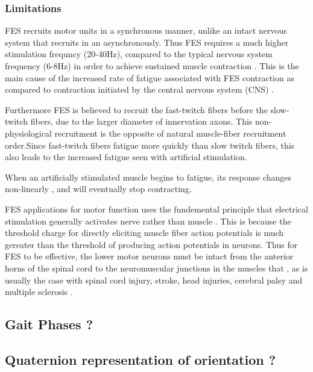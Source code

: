 \subsubsection{Limitations}
FES recruits motor units in a synchronous manner, unlike an intact nervous system that recruits in an asynchronously. Thus FES requires a much higher stimulation frequncy (20-40Hz), compared to the typical nervous system frequency (6-8Hz) in order to achieve sustained muscle contraction \cite{lynch_functional_2008}. This is the main cause of the increased rate of fatigue associated with FES contraction as compared to contraction initiated by the central nervous system (CNS) \cite{gilman_handbook_1983}. 

Furthermore FES is believed to recruit the fast-twitch fibers before the slow-twitch fibers, due to the larger diameter of innervation axons. This non-physiological recruitment is the opposite of natural muscle-fiber recruitment order.Since fast-twitch fibers fatigue more quickly than slow twitch fibers, this also leads to the increased fatigue seen with artificial stimulation. \cite{lynch_functional_2008}

When an artificially stimulated muscle begins to fatigue, its response changes non-linearly \cite{lynch_functional_2008}, and will eventually stop contracting. 

FES applications for motor function uses the fundemental principle that electrical stimulation generally activates nerve rather than muscle \cite{peckham_functional_2005}. This is because the threshold charge for directly eliciting muscle fiber action potentials is much gereater than the threshold of producing action potentials in neurons. Thus for FES to be effective, the lower motor neurons must be intact from the anterior horns of the spinal cord to the neuromuscular junctions in the muscles that , as is usually the case with spinal cord injury, stroke, head injuries, cerebral palsy and multiple sclerosis \cite{gregory_recruitment_2005}. 

\subsection{Gait Phases ?}

\subsection{Quaternion representation of orientation ?}






